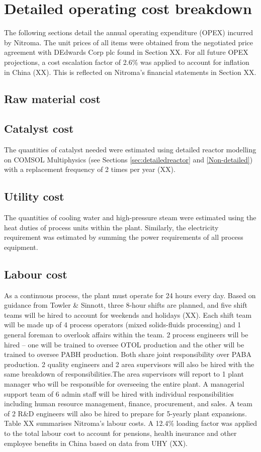 \section{Detailed operating cost breakdown}
The following sections detail the annual operating expenditure (OPEX) incurred by Nitroma. The unit prices of all items were obtained from the negotiated price agreement with DEdwards Corp plc found in Section XX. For all future OPEX projections, a cost escalation factor of 2.6\% was applied to account for inflation in China (XX). This is reflected on Nitroma’s financial statements in Section XX.

\subsection{Raw material cost}
\label{sec:opex-raw-material}

\subsection{Catalyst cost}
 The quantities of catalyst needed were estimated using detailed reactor modelling on COMSOL Multiphysics (see Sections \ref{sec:detailedreactor} and \ref{Non-detailed}) with a replacement frequency of 2 times per year (XX).

\subsection{Utility cost}
 The quantities of cooling water and high-pressure steam were estimated using the heat duties of process units within the plant. Similarly, the electricity requirement was estimated by summing the power requirements of all process equipment.  

\subsection{Labour cost}
As a continuous process, the plant must operate for 24 hours every day. Based on guidance from Towler \& Sinnott, three 8-hour shifts are planned, and five shift teams will be hired to account for weekends and holidays (XX). Each shift team will be made up of 4 process operators (mixed solids-fluids processing) and 1 general foreman to overlook affairs within the team. 2 process engineers will be hired – one will be trained to oversee OTOL production and the other will be trained to oversee PABH production. Both share joint responsibility over PABA production. 2 quality engineers and 2 area supervisors will also be hired with the same breakdown of responsibilities.The area supervisors will report to 1 plant manager who will be responsible for overseeing the entire plant. A managerial support team of 6 admin staff will be hired with individual responsibilities including human resource management, finance, procurement, and sales. A team of 2 R\&D engineers will also be hired to prepare for 5-yearly plant expansions.
Table XX summarises Nitroma's labour costs. A 12.4\% loading factor was applied to the total labour cost to account for pensions, health insurance and other employee benefits in China based on data from UHY (XX).

